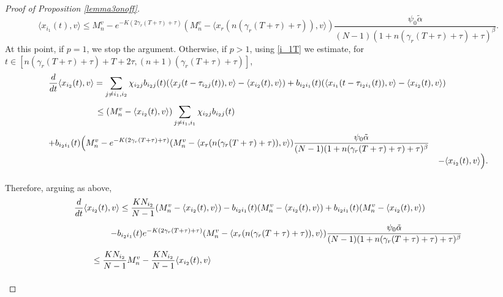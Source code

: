 \documentclass[11pt]{article}
\begin{document}
\begin{proof}[Proof of Proposition \ref{lemma3onoff}]
		\begin{equation}\label{i_1T}
			\langle x_{i_1}(t),v\rangle\leq M^v_n-e^{-K(2\gamma_r(T+\tau)+\tau)}(M_n^v-\langle x_r(n(\gamma_r(T+\tau)+\tau)),v \rangle)\frac{\psi_0\tilde{\alpha}}{(N-1)(1+n(\gamma_r(T+\tau)+\tau)+\tau)^\beta}.
		\end{equation}	
		At this point, if $p=1$, we stop the argument. Otherwise, if $p>1$, using \eqref{i_1T} we estimate, for $t\in [n(\gamma_r(T+\tau)+\tau)+T+2\tau,(n+1)(\gamma_r(T+\tau)+\tau)]$,
		$$\begin{array}{l}
			\vspace{0.3cm}\displaystyle{\frac{d}{d t}  \langle x_{i_2}(t),v\rangle =  \sum_{j \neq i_1, i_2} \chi_{i_2j} b_{i_2j}(t)( \langle x_{j}(t-\tau_{i_2j}(t)),v\rangle-\langle x_{i_2}(t),v\rangle)+ b_{i_2i_1}(t)(\langle x_{i_1}(t-\tau_{i_2i_1}(t)),v\rangle-\langle x_{i_2}(t),v\rangle) }\\
			\vspace{0.3cm}\displaystyle{\hspace{2cm}\leq ( M_{n}^v-\langle x_{i_2}(t),v\rangle)\sum_{j \neq i_1, i_1} \chi_{i_2j} b_{i_2j}(t)} \\
			\displaystyle{+ b_{i_2i_1}(t)\Big (M^v_n-e^{-K(2\gamma_r(T+\tau)+\tau)}(M_n^v-\langle x_r(n(\gamma_r(T+\tau)+\tau)),v \rangle)\frac{\psi_0\tilde{\alpha}}{(N-1)(1+n(\gamma_r(T+\tau)+\tau)+\tau)^\beta}}\\ \vspace{0.3cm}
				\displaystyle{\hspace{16 cm} -\langle x_{i_2}(t),v\rangle\Big).}
		\end{array}$$
		Therefore, arguing as above, 
		$$\begin{array}{l}
			\vspace{0.3cm}\displaystyle{\frac{d}{d t}  \langle x_{i_2}(t),v\rangle \leq \frac{KN_{i_{2}}}{N-1}(M_{n}^v-\langle x_{i_2}(t),v\rangle) -b_{i_2i_1}(t)(M_{n}^v-\langle x_{i_2}(t),v\rangle) + b_{i_2i_1}(t)(M^v_n-\langle x_{i_2}(t),v\rangle)}\\
			\vspace{0.3cm}\displaystyle{\hspace{1.5cm}-b_{i_2i_1}(t)e^{-K(2\gamma_r(T+\tau)+\tau)}(M_n^v-\langle x_r(n(\gamma_r(T+\tau)+\tau)),v \rangle)\frac{\psi_0\tilde{\alpha}}{(N-1)(1+n(\gamma_r(T+\tau)+\tau)+\tau)^\beta}}\\
			\vspace{0.3cm}\displaystyle{\hspace{0.8cm}\leq \frac{KN_{i_{2}}}{N-1}M_{n}^v-\frac{KN_{i_{2}}}{N-1}\langle x_{i_2}(t),v\rangle}\\

\end{array}$$
\end{proof}
\end{document}
